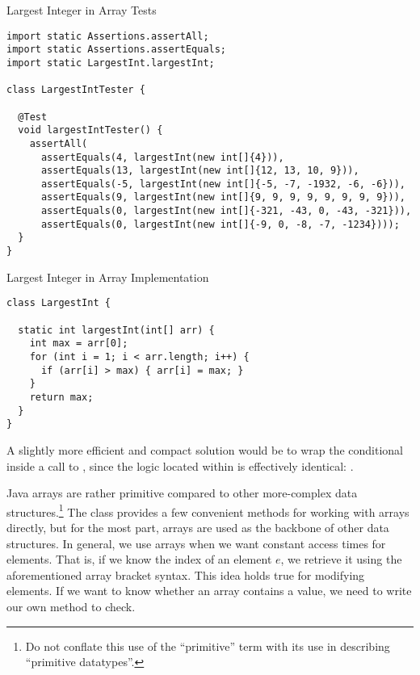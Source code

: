 \begin{cl}{Largest Integer in Array Tests}
\begin{lstlisting}[language=MyJava]
import static Assertions.assertAll;
import static Assertions.assertEquals;
import static LargestInt.largestInt;

class LargestIntTester {

  @Test
  void largestIntTester() {
    assertAll(
      assertEquals(4, largestInt(new int[]{4})), 
      assertEquals(13, largestInt(new int[]{12, 13, 10, 9})), 
      assertEquals(-5, largestInt(new int[]{-5, -7, -1932, -6, -6})), 
      assertEquals(9, largestInt(new int[]{9, 9, 9, 9, 9, 9, 9, 9})), 
      assertEquals(0, largestInt(new int[]{-321, -43, 0, -43, -321})), 
      assertEquals(0, largestInt(new int[]{-9, 0, -8, -7, -1234})));
  }
}
\end{lstlisting}
\end{cl}

\begin{cl}{Largest Integer in Array Implementation}
\begin{lstlisting}[language=MyJava]
class LargestInt {

  static int largestInt(int[] arr) {
    int max = arr[0];
    for (int i = 1; i < arr.length; i++) {
      if (arr[i] > max) { arr[i] = max; }
    }
    return max;
  }
}
\end{lstlisting}
\end{cl}

A slightly more efficient and compact solution would be to wrap the conditional inside a call to , since the logic located within is effectively identical: .

Java arrays are rather primitive compared to other more-complex data structures.\footnote{Do not conflate this use of the ``primitive'' term with its use in describing ``primitive datatypes''.} The  class provides a few convenient methods for working with arrays directly, but for the most part, arrays are used as the backbone of other data structures. In general, we use arrays when we want constant access times for elements. That is, if we know the index of an element $e$, we retrieve it using the aforementioned array bracket syntax. This idea holds true for modifying elements. If we want to know whether an array contains a value, we need to write our own method to check. 

